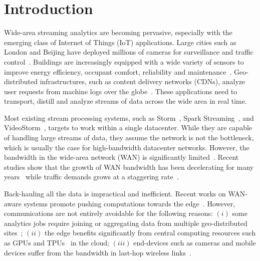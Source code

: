 \section{Introduction}

Wide-area streaming analytics are becoming pervasive, especially with the
emerging class of Internet of Things (IoT) applications.  Large cities such as
London and Beijing have deployed millions of cameras for surveillance and
traffic control~\cite{london.surveillance, skynet}. Buildings are increasingly
equipped with a wide variety of sensors to improve energy efficiency, occupant
comfort, reliability and
maintenance~\cite{krioukov2012building}. Geo-distributed infrastructures, such as
content delivery networks (CDNs), analyze user requests from machine logs over the
globe~\cite{mukerjee2015practical}. These applications need to transport,
distill and analyze streams of data across the wide area in real time.

Most existing stream processing systems, such as
Storm~\cite{toshniwal2014storm}, Spark Streaming~\cite{zaharia2013discretized},
and VideoStorm~\cite{zhang2017live}, targets to work within a single datacenter.
While they are capable of handling large streams of data, they assume the
network is not the bottleneck, which is usually the case for high-bandwidth
datacenter networks. However, the bandwidth in the wide-area network (WAN) is
significantly limited~\cite{hsieh17gaia, vulimiri2015global}. Recent studies
show that the growth of WAN bandwidth has been decelerating for many
years~\cite{global2016telegeography} while traffic demands grows at a staggering
rate~\cite{index2013zettabyte}.

Back-hauling all the data is impractical and inefficient. Recent
works on WAN-aware systems promote pushing computations towards the
edge~\cite{satyanarayanan2009case, rabkin2014aggregation, pu2015low}. However,
communications are not entirely avoidable for the following reasons: $(i)$ some
analytics jobs require joining or aggregating data from multiple geo-distributed
sites~\cite{pu2015low, viswanathan2016clarinet}; $(ii)$ the edge benefits
significantly from central computing resources such as GPUs and
TPUs~\cite{abadi2016tensorflow} in the cloud; $(iii)$ end-devices such as cameras
and mobile devices suffer from the bandwidth in last-hop wireless
links~\cite{zhang2015design, abari2017enabling}.


